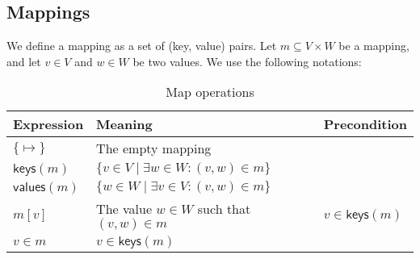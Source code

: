 \documentclass{article}
\newcommand{\func}[1]{\ensuremath{\textsf{#1}}} %
\newcommand{\emptymap}{\ensuremath{\{ \mapsto \}}}
\begin{document}
\subsection{Mappings}
We define a mapping as a set of (key, value) pairs.
Let $m \subseteq V \times W$ be a mapping, and let $v \in V$ and $w \in W$ be two values. We use the following notations:

\begin{table}[h!]
\centering
\begin{tabular}{||l | l | l||} 
 \hline
 \textbf{Expression} & \textbf{Meaning} & \textbf{Precondition} \\ [0.5ex] 
 \hline\hline
 $\emptymap$ & The empty mapping & \\
 $\func{keys}(m)$ & $\{ v \in V \mid \exists w \in W: (v,w) \in m \}$ & \\
 $\func{values}(m)$ & $\{ w \in W \mid \exists v \in V: (v,w) \in m \}$ & \\
 $m[v]$ & The value $w \in W$ such that $(v,w) \in m$ & $v \in \func{keys}(m)$ \\
 $v \in m$ & $v \in \func{keys}(m)$ & \\
 \hline
\end{tabular}
\caption{Map operations}
\label{table:1}
\end{table}


\newpage


\end{document}
